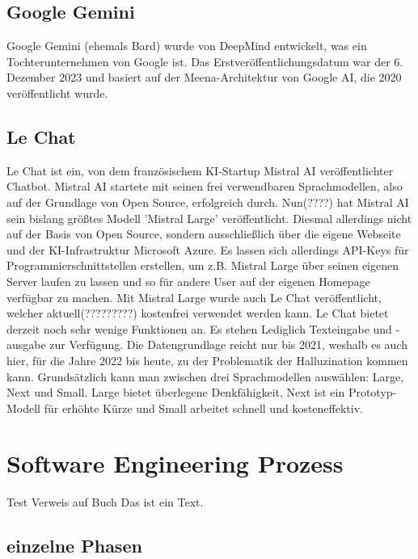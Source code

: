 \subsection{Google Gemini}  \label{Google Gemini}

Google Gemini (ehemals Bard) wurde von DeepMind entwickelt, was ein Tochterunternehmen von Google ist.  
Das Erstveröffentlichungsdatum war der 6. Dezember 2023 und basiert auf der Meena-Architektur von Google AI,  
die 2020 veröffentlicht wurde.

\subsection{Le Chat}  \label{Le Chat}

Le Chat ist ein, von dem französischem KI-Startup Mistral AI veröffentlichter Chatbot. Mistral AI startete mit  
seinen frei verwendbaren Sprachmodellen, also auf der Grundlage von Open Source, erfolgreich durch. Nun(????)  
hat Mistral AI sein bislang größtes Modell 'Mistral Large' veröffentlicht. Diesmal allerdings nicht auf der  
Basis von Open Source, sondern ausschließlich über die eigene Webseite und der KI-Infrastruktur Microsoft  
Azure. Es lassen sich allerdings API-Keys für Programmierschnittstellen erstellen, um z.B. Mistral Large über  
seinen eigenen Server laufen zu lassen und so für andere User auf der eigenen Homepage verfügbar zu machen.  
Mit Mistral Large wurde auch Le Chat veröffentlicht, welcher aktuell(?????????) kostenfrei verwendet werden kann.
Le Chat bietet derzeit noch sehr wenige Funktionen an. Es stehen Lediglich Texteingabe und -ausgabe zur Verfügung.  
Die Datengrundlage reicht nur bis 2021, weshalb es auch hier, für die Jahre 2022 bis heute, zu der Problematik der  
Halluzination kommen kann.
Grundsätzlich kann man zwischen drei Sprachmodellen auswählen: Large, Next und Small. Large bietet überlegene Denkfähigkeit,  
Next ist ein Prototyp-Modell für erhöhte Kürze und Small arbeitet schnell und kosteneffektiv. \cite{GrundlagenLeChat}

\section{Software Engineering Prozess}
Test Verweis auf Buch \cite{Sommerville10} Das ist ein Text.
\subsection{einzelne Phasen}  \label{einzelne Phasen}
